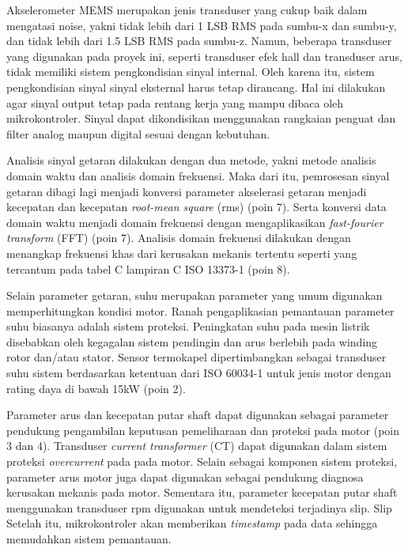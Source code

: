 \documentclass{elsinta}
\begin{document}
Akselerometer MEMS merupakan jenis transduser yang
cukup baik dalam mengatasi noise, yakni tidak lebih dari 
1 LSB RMS pada sumbu-x dan sumbu-y, dan tidak lebih dari 
1.5 LSB RMS pada sumbu-z\cite{ADXL345}.
Namun, beberapa transduser yang digunakan pada proyek ini,
seperti transduser efek hall\cite{AllegroMicrosystems2018} dan transduser arus\cite{AllegroMicrosystems2020}, 
tidak memiliki sistem pengkondisian sinyal internal.
Oleh karena itu, sistem pengkondisian sinyal sinyal eksternal harus
tetap dirancang. Hal ini dilakukan agar sinyal output tetap pada rentang
kerja yang mampu dibaca oleh mikrokontroler. Sinyal
dapat dikondisikan menggunakan rangkaian penguat dan filter
analog maupun digital sesuai dengan kebutuhan.

Analisis sinyal getaran dilakukan
dengan dua metode, yakni metode analisis domain waktu
dan analisis domain frekuensi. Maka dari itu,
pemrosesan sinyal getaran dibagi lagi menjadi
konversi parameter akselerasi getaran
menjadi kecepatan dan kecepatan \textit{root-mean square} (rms) (poin 7). Serta konversi
data domain waktu menjadi domain frekuensi dengan mengaplikasikan
\textit{fast-fourier
transform} (FFT)\cite{InternationalOrganizationforStandardization2016} (poin 7). Analisis domain frekuensi
dilakukan dengan menangkap frekuensi khas dari kerusakan
mekanis tertentu seperti yang tercantum pada tabel C
lampiran C ISO 13373-1\cite{InternationalOrganizationforStandardization2002} (poin 8).

Selain parameter getaran, suhu merupakan parameter yang umum digunakan
memperhitungkan kondisi motor. Ranah pengaplikasian pemantauan
parameter suhu biasanya adalah sistem proteksi\cite{Sonnaillon2010}. Peningkatan
suhu pada mesin listrik disebabkan oleh kegagalan sistem pendingin
dan arus berlebih pada winding rotor dan/atau stator\cite{Bonnett1991}. 
Sensor termokapel dipertimbangkan sebagai transduser suhu sistem
berdasarkan ketentuan dari ISO 60034-1 untuk jenis motor dengan
rating daya di bawah 15kW\cite{InternationalElectrotechnicalCommission2022} (poin 2). 

Parameter arus dan kecepatan putar shaft dapat 
digunakan sebagai 
parameter pendukung pengambilan keputusan pemeliharaan dan proteksi 
pada motor (poin 3 dan 4). Transduser \textit{current transformer} (CT)
dapat digunakan dalam sistem proteksi
\textit{overcurrent} pada pada motor\cite{Kishibe2001}. Selain sebagai komponen
sistem proteksi, parameter arus motor juga dapat digunakan sebagai pendukung diagnosa
kerusakan mekanis pada motor\cite{Ayankoso2026}. 
Sementara itu, parameter kecepatan putar shaft menggunakan
transduser rpm digunakan untuk mendeteksi terjadinya slip.
Slip
Setelah itu,
mikrokontroler akan memberikan
\textit{timestamp} pada data sehingga memudahkan 
sistem pemantauan. 
\end{document}
